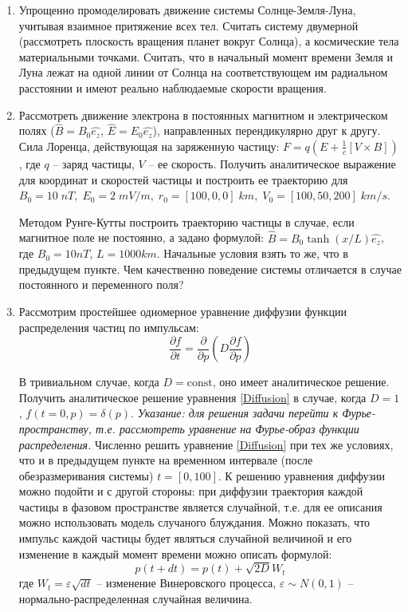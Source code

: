 \documentclass{article}
\begin{document}
\begin{enumerate}
\item Упрощенно промоделировать движение системы Солнце-Земля-Луна, учитывая
взаимное притяжение всех тел. Считать систему двумерной (рассмотреть плоскость
вращения планет вокруг Солнца), а космические тела материальными точками.
Считать, что в начальный момент времени Земля и Луна лежат на одной линии от
Солнца на соответствующем им радиальном расстоянии и имеют реально наблюдаемые
скорости вращения.

\item Рассмотреть движение электрона в постоянных магнитном и электрическом
полях ($\hat{B}=B_0 \hat{e_z}$, $\hat{E}=E_0 \hat{e_z}$), направленных
перендикулярно друг к другу. Сила Лоренца, действующая на заряженную частицу:
$F=q(E+\frac{1}{c}[V \times B])$, где $q$ -- заряд частицы, $V$ -- ее скорость.
\subitem Получить аналитическое выражение для координат и скоростей частицы и
построить ее траекторию для $B_0=10 \; nT, \; E_0=2 \; mV/m, \; r_0=[100,0,0] \; km, \; V_0=[100, 50, 200] \; km/s$.

\subitem Методом Рунге-Кутты построить траекторию частицы в случае, если
магнитное поле не постоянно, а задано формулой:
$\hat{B}=B_0 \tanh(x/L) \hat{e_z}$, где $B_0=10nT$, $L=1000 km$. Начальные
условия взять то же, что в предыдущем пункте. Чем качественно поведение системы
отличается в случае постоянного и переменного поля?

\item Рассмотрим простейшее одномерное уравнение диффузии функции
распределения частиц по импульсам:
\begin{equation}\label{Diffusion}
\frac{\partial f}{\partial t}=\frac{\partial}{\partial p}\left(D\frac{\partial f}{\partial p} \right)
\end{equation}

В тривиальном случае, когда $D=\mathrm{const}$, оно имеет аналитическое решение.
\subitem Получить аналитическое решение уравнения \eqref{Diffusion} в случае,
когда $D=1$, $f(t=0,p)=\delta(p)$.
\textit{Указание: для решения задачи перейти к Фурье-пространству, т.е.
рассмотреть уравнение на Фурье-образ функции распределения.}
\subitem Численно решить уравнение \eqref{Diffusion} при тех же условиях, что и в
предыдущем пункте на временном интервале (после обезразмеривания системы) $t=[0,100]$.
\subitem К решению уравнения диффузии можно подойти и с другой стороны:
при диффузии траектория каждой частицы в фазовом пространстве является случайной,
т.е. для ее описания можно использовать модель случаного блуждания. Можно показать,
что импульс каждой частицы будет являться случайной величиной и его изменение в каждый
момент времени можно описать формулой:
\begin{equation}
p(t+dt)=p(t)+\sqrt{2D}W_t
\end{equation}
где $W_t=\varepsilon \sqrt{dt}$ -- изменение Винеровского процесса,
$\varepsilon\sim N(0,1)$ -- нормально-распределенная случайная величина.


\end{enumerate}
\end{document}
